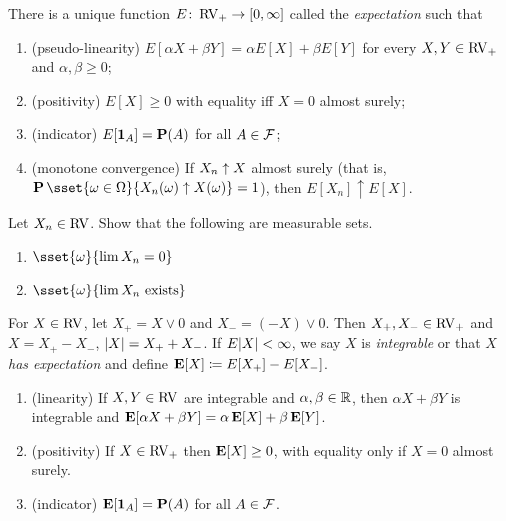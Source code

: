 \begin{theorem*}
\label{thm:expectation}
    There is a unique function $E\colon \operatorname{RV}_+ \to [0, \infty]$ called
    the \emph{expectation} such that
    \begin{enumerate}[label=\small(E\arabic*)]
        \item (pseudo-linearity)
            $E[\alpha X + \beta Y] = \alpha E[X] + \beta E[Y]$
            for every $X, Y \in \operatorname{RV}_+$ and $\alpha, \beta \ge 0$;
        \item (positivity) $E[X] \ge 0$ with equality iff $X = 0$ almost
            surely; %
        \item (indicator) $E[\bm{1}_{A}] = \operatorname{\mathbf P}(A)$ for all $A \in \mathcal F$;
        \item (monotone convergence) If $X_n \uparrow X$ almost surely
        (that is, $\P\sset{\omega \in \Omega}{X_n(\omega)
        \upto X(\omega)} = 1$), then
            $E[X_n] \uparrow E[X]$.
    \end{enumerate}
\end{theorem*}

\begin{exercise}
    Let $X_n \in \operatorname{RV}$.
    Show that the following are measurable sets.
    \begin{enumerate}
        \item $\sset{\omega}{\lim X_n = 0}$
        \item $\sset{\omega}{\lim X_n \text{ exists}}$
    \end{enumerate}
\end{exercise}

\begin{definition}[Expectation] \label{def:expectation}
    For $X \in \operatorname{RV}$, let $X_+ = X \vee 0$ and $X_- = (-X) \vee 0$.
    Then $X_+, X_- \in \operatorname{RV}_+$ and $X = X_+ - X_-$, $\lvert X\rvert = X_+ + X_-$.
    If $E \lvert X\rvert < \infty$, we say $X$ is \emph{integrable} or that
    $X$ \emph{has expectation} and define
    $\operatorname{\mathbf E}[X] \coloneq E[X_+] - E[X_-]$.
\end{definition}

\begin{proposition}
    \leavevmode
    \begin{enumerate}
        \item (linearity) If $X, Y \in \operatorname{RV}$ are integrable and
            $\alpha, \beta \in \mathbb{R}$, then $\alpha X + \beta Y$ is integrable
            and $\operatorname{\mathbf E}[\alpha X + \beta Y] = \alpha \operatorname{\mathbf E}[X] + \beta \operatorname{\mathbf E}[Y]$.
        \item (positivity) If $X \in \operatorname{RV}_+$ then $\operatorname{\mathbf E}[X] \ge 0$,
            with equality only if $X = 0$ almost surely.
        \item (indicator) $\operatorname{\mathbf E}[\bm{1}_{A}] = \operatorname{\mathbf P}(A)$ for all $A \in \mathcal F$.
    \end{enumerate}
\end{proposition}

